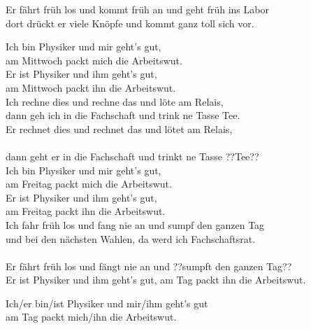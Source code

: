 \begin{verseplay}[6em]
\s{\Chor}  Er fährt früh los und kommt früh an und geht früh ins Labor\\
dort drückt er viele Knöpfe und kommt ganz toll sich vor.

\s{\Sing} Ich bin Physiker und mir geht's gut,\\
am Mittwoch packt mich die Arbeitswut.\\

\s{\Chor} Er ist Physiker und ihm geht's gut,\\
am Mittwoch packt ihn die Arbeitswut.\\

\s{\Sing} Ich rechne dies und rechne das und löte am Relais,\\
dann geh ich in die Fachschaft und trink ne Tasse Tee.\\

\s{\Chor} Er rechnet dies und rechnet das und lötet am Relais,\\
\\
dann geht er in die Fachschaft und trinkt ne Tasse ??Tee??\\

\s{\Sing} Ich bin Physiker und mir geht's gut,\\
am Freitag packt mich die Arbeitswut.\\

\s{\Chor} Er ist Physiker und ihm geht's gut,\\
am Freitag packt ihn die Arbeitswut.\\

\s{\Sing} Ich fahr früh los und fang nie an und sumpf den ganzen Tag\\
und bei den nächsten Wahlen, da werd ich Fachschaftsrat.\\

\s{\Chor} \\
Er fährt früh los und fängt nie an und ??sumpft den ganzen Tag??\\

Er ist Physiker und ihm geht's gut, am Tag  packt ihn die Arbeitswut.

\s{\Alle} 
Ich/er bin/ist Physiker und mir/ihm geht's gut \\
am Tag packt mich/ihn die Arbeitswut.

\end{verseplay}

